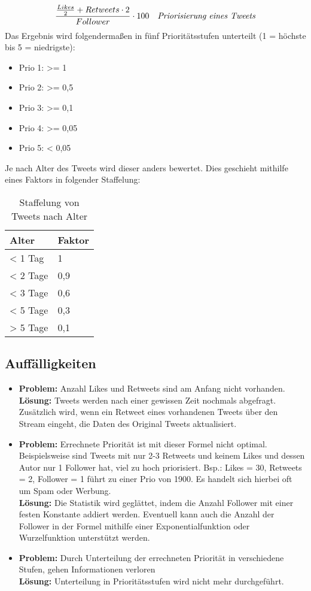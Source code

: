 \begin{equation}
\frac{\frac{Likes}{2} + Retweets \cdot 2}{Follower} \cdot 100
\quad
\text{\textit{Priorisierung eines Tweets}}
\end{equation}
Das Ergebnis wird folgendermaßen in fünf Prioritätsstufen unterteilt (1 = höchste bis 5 = 
niedrigste):
\begin{itemize}
	\item Prio 1: >= 1
	\item Prio 2: >= 0,5
	\item Prio 3: >= 0,1
	\item Prio 4: >= 0,05
	\item Prio 5: < 0,05 
\end{itemize}
Je nach Alter  des Tweets wird dieser anders bewertet. Dies geschieht mithilfe eines  
Faktors in folgender Staffelung: 
\begin{table}[!hb]
	\centering
	\begin{tabular}{ll}
		\toprule
		\textbf{Alter} & \textbf{Faktor}  \\
		\hline
		< 1 Tag & 1 \\
		< 2 Tage & 0,9 \\
		< 3 Tage & 0,6 \\
		< 5 Tage & 0,3 \\
		> 5 Tage & 0,1 \\
		\bottomrule
	\end{tabular}
	\caption{Staffelung von Tweets nach Alter}
\end{table}
\subsection*{Auffälligkeiten}
\begin{itemize}
	\item \textbf{Problem:} Anzahl Likes und Retweets sind am Anfang nicht vorhanden. \\ \textbf{Lösung:} Tweets werden nach einer gewissen Zeit nochmals abgefragt. Zusätzlich wird, wenn ein Retweet eines vorhandenen Tweets über den Stream eingeht, die Daten des Original Tweets aktualisiert. 
	\item \textbf{Problem:} Errechnete Priorität ist mit dieser Formel nicht optimal. Beispielsweise sind Tweets mit nur 2-3 Retweets und keinem Likes und dessen Autor nur 1 Follower hat, viel zu hoch priorisiert. Bsp.: Likes = 30, Retweets = 2, Follower = 1 führt zu einer Prio von 1900. Es handelt sich hierbei oft um Spam oder Werbung. \\ \textbf{Lösung:} Die Statistik wird geglättet, indem die Anzahl Follower mit einer festen Konstante addiert werden. Eventuell kann auch die Anzahl der Follower in der Formel mithilfe einer Exponentialfunktion oder Wurzelfunktion unterstützt werden. 
	\item \textbf{Problem:} Durch Unterteilung der errechneten Priorität in verschiedene Stufen, gehen Informationen verloren \\ \textbf{Lösung:} Unterteilung in Prioritätsstufen wird nicht mehr durchgeführt.
\end{itemize}

